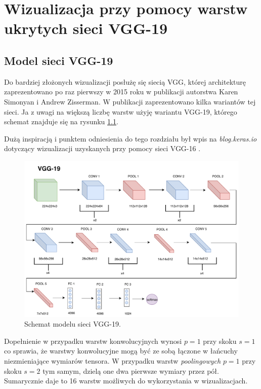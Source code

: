 \chapter{Wizualizacja przy pomocy warstw ukrytych sieci VGG-19}
\label{chap:vgg}
\section{Model sieci VGG-19}
\label{vgg-model}

Do bardziej złożonych wizualizacji posłużę się siecią VGG, której architekturę zaprezentowano po raz pierwszy w 2015 roku w publikacji autorstwa Karen Simonyan i 
Andrew Zisserman\cite{vggpaper}. W publikacji zaprezentowano kilka wariantów tej sieci. Ja z uwagi na większą liczbę warstw użyję wariantu VGG-19, którego schemat znajduje się na rysunku \ref{fig:vgg19-schemat}. 

Dużą inspiracją i punktem odniesienia do tego rozdziału był wpis na \textit{blog.keras.io} dotyczący wizualizacji uzyskanych przy pomocy sieci VGG-16 \cite{kerasvgg}.

\begin{figure}[ht]
\centerline{\includegraphics[scale=0.5]{resources/vgg/vgg.pdf}}
\caption{Schemat modelu sieci VGG-19.}
\label{fig:vgg19-schemat}
\end{figure}

Dopełnienie w przypadku warstw konwolucyjnych wynosi \(p=1\) przy skoku \(s=1\) co sprawia, że warstwy konwolucyjne mogą być ze sobą łączone w łańcuchy niezmieniające wymiarów tensora. W przypadku warstw \textit{poolingowych} \(p=1\) przy skoku \(s=2\) tym samym, dzielą one dwa pierwsze wymiary przez pół. Sumarycznie daje to 16 warstw możliwych do wykorzystania w wizualizacjach.

